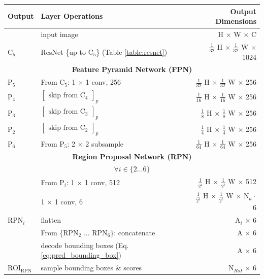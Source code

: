 {
\begin{table}[h]
\centering
\begin{tabular}{llr}
\toprule
\textbf{Output} & \textbf{Layer Operations} & \textbf{Output Dimensions} \\
\midrule\midrule
& input image & H $\times$ W $\times$ C \\
\midrule
C$_5$ & ResNet \{up to C$_5$\} (Table \ref{table:resnet})  & $\tfrac{1}{32}$ H $\times$ $\tfrac{1}{32}$ W $\times$ 1024 \\
\midrule
\multicolumn{3}{c}{\textbf{Feature Pyramid Network (FPN)}}\\
\midrule
P$_5$ & From C$_5$: 1 $\times$ 1 conv, 256 & $\tfrac{1}{32}$ H $\times$ $\tfrac{1}{32}$ W $\times$ 256 \\
P$_4$ & $\begin{bmatrix}\textrm{skip from C$_4$}\end{bmatrix}_p$ & $\tfrac{1}{16}$ H $\times$ $\tfrac{1}{16}$ W $\times$ 256 \\
P$_3$ & $\begin{bmatrix}\textrm{skip from C$_3$}\end{bmatrix}_p$ & $\tfrac{1}{8}$ H $\times$ $\tfrac{1}{8}$ W $\times$ 256 \\
P$_2$ & $\begin{bmatrix}\textrm{skip from C$_2$}\end{bmatrix}_p$ & $\tfrac{1}{4}$ H $\times$ $\tfrac{1}{4}$ W $\times$ 256 \\
P$_6$ & From P$_5$: 2 $\times$ 2 subsample & $\tfrac{1}{64}$ H $\times$ $\tfrac{1}{64}$ W $\times$ 256 \\
\midrule
\multicolumn{3}{c}{\textbf{Region Proposal Network (RPN)}}\\
\midrule
\multicolumn{3}{c}{$\forall i \in \{2...6\}$}\\
& From P$_i$: 1 $\times$ 1 conv, 512 & $\tfrac{1}{2^i}$ H $\times$ $\tfrac{1}{2^i}$ W $\times$ 512 \\
& 1 $\times$ 1 conv, 6 & $\tfrac{1}{2^i}$ H $\times$ $\tfrac{1}{2^i}$ W $\times$ $\text{N}_a \cdot$ 6 \\
RPN$_i$& flatten & A$_i$ $\times$ 6 \\
\midrule
& From \{RPN$_2$ ... RPN$_6$\}: concatenate & A $\times$ 6 \\
& decode bounding boxes (Eq. \ref{eq:pred_bounding_box}) & A $\times$ 6 \\
ROI$_{\mathrm{RPN}}$ & sample bounding boxes \& scores & N$_{RoI}$ $\times$ 6 \\
\midrule

\end{tabular}
\end{table}}
